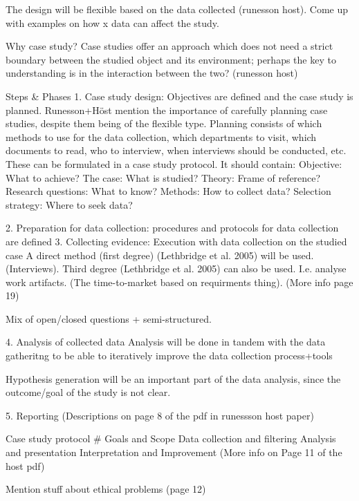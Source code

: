 \documentclass[times, 10pt,twocolumn]{IEEEtran}
\begin{document}
The design will be flexible based on the data collected (runesson host). 
	Come up with examples on how x data can affect the study. 


Why case study? 
Case studies offer an approach which does not need a strict boundary between the studied object and its environment; perhaps the key to understanding is in the interaction between the two? (runesson host)

Steps \& Phases
1. Case study design: Objectives are defined and the case study is planned. 
Runesson+Höst mention the importance of carefully planning case studies, despite them being of the flexible type. 
Planning consists of which methods to use for the data collection, which departments to visit, which documents to read, who to interview, when interviews should be conducted, etc. These can be formulated in a case study protocol. 
It should contain: 
Objective: What to achieve?
The case: What is studied?
Theory: Frame of reference?
Research questions: What to know?
Methods: How to collect data?
Selection strategy: Where to seek data?

2. Preparation for data collection: procedures and protocols for data collection are defined
3. Collecting evidence: Execution with data collection on the studied case
A direct method (first degree) (Lethbridge et al. 2005) will be used. (Interviews).
Third degree (Lethbridge et al. 2005) can also be used. I.e. analyse work artifacts. (The time-to-market based on requirments thing). (More info page 19)

Mix of open/closed questions + semi-structured. 




4. Analysis of collected data
Analysis will be done in tandem with the data gatheritng to be able to iteratively improve the data collection process+tools

Hypothesis generation will be an important part of the data analysis, since the outcome/goal of the study is not clear. 


5. Reporting
(Descriptions on page 8 of the pdf in runessson host paper)


Case study protocol
\#	Goals and Scope		Data collection and filtering	Analysis and presentation	Interpretation and Improvement
(More info on Page 11 of the host pdf)

Mention stuff about ethical problems (page 12)
\end{document}
